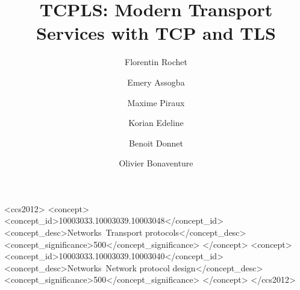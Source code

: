 \documentclass[sigconf]{acmart}
\begin{document}
\title[TCPLS]{TCPLS: Modern Transport Services with TCP and TLS}


\author{Florentin Rochet}

\author{Emery Assogba}

\author{Maxime Piraux}

\author{Korian Edeline}

\author{Benoit Donnet}

\author{Olivier Bonaventure}

\begin{CCSXML}
<ccs2012>
<concept>
<concept_id>10003033.10003039.10003048</concept_id>
<concept_desc>Networks~Transport protocols</concept_desc>
<concept_significance>500</concept_significance>
</concept>
<concept>
<concept_id>10003033.10003039.10003040</concept_id>
<concept_desc>Networks~Network protocol design</concept_desc>
<concept_significance>500</concept_significance>
</concept>
</ccs2012>
\end{CCSXML}


\renewcommand{\shortauthors}{F. Rochet et al.}
\end{document}
